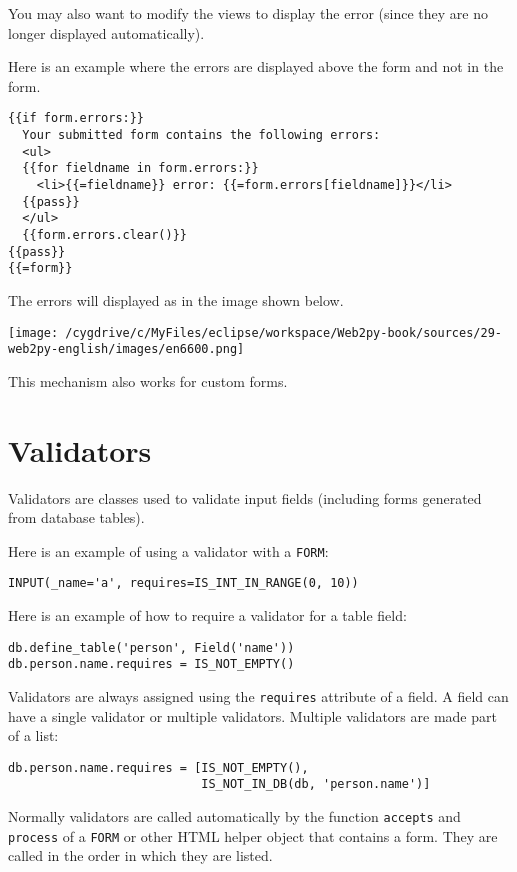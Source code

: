\documentclass[justified,sixbynine,notoc]{tufte-book}
\def\ft{\small\tt}
\def\inxx#1{\index{#1}}
\begin{document}
\begin{fullwidth}
You may also want to modify the views to display the error (since they are no longer displayed automatically).

Here is an example where the errors are displayed above the form and not in the form.
\begin{lstlisting}[keywords={}]
{{if form.errors:}}
  Your submitted form contains the following errors:
  <ul>
  {{for fieldname in form.errors:}}
    <li>{{=fieldname}} error: {{=form.errors[fieldname]}}</li>
  {{pass}}
  </ul>
  {{form.errors.clear()}}
{{pass}}
{{=form}}
\end{lstlisting}

The errors will displayed as in the image shown below.


\goodbreak\begin{center}\texttt{[image: /cygdrive/c/MyFiles/eclipse/workspace/Web2py-book/sources/29-web2py-english/images/en6600.png]}\end{center}


This mechanism also works for custom forms.

\goodbreak\section{Validators}

\inxx{validators}

Validators are classes used to validate input fields (including forms generated from database tables).

Here is an example of using a validator with a {\ft FORM}:
\begin{lstlisting}
INPUT(_name='a', requires=IS_INT_IN_RANGE(0, 10))
\end{lstlisting}

Here is an example of how to require a validator for a table field:
\begin{lstlisting}
db.define_table('person', Field('name'))
db.person.name.requires = IS_NOT_EMPTY()
\end{lstlisting}

Validators are always assigned using the {\ft requires} attribute of a field. A field can have a single validator or multiple validators. Multiple validators are made part of a list:
\begin{lstlisting}
db.person.name.requires = [IS_NOT_EMPTY(),
                           IS_NOT_IN_DB(db, 'person.name')]
\end{lstlisting}

Normally validators are called automatically by the function {\ft accepts} and {\ft process} of a {\ft FORM} or other HTML helper object that contains a form. They are called in the order in which they are listed.


\end{fullwidth}
\end{document}
